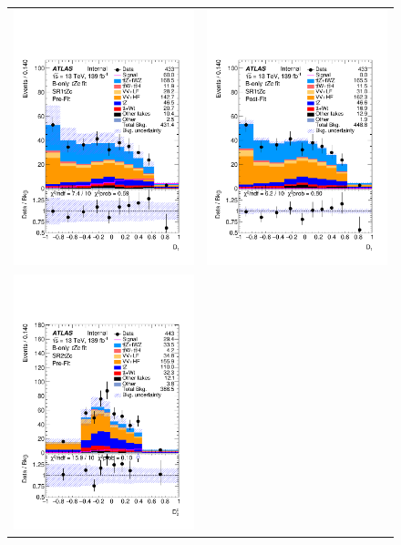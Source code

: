 \clearpage
\begin{figure}[htbp]
	\centering
	\begin{tabular}{cc}
		\includegraphics[width=.45\textwidth]{Appendices/AP10/figures/BONLY_CRSR_DL1rc_unblind/Plots/SR1} &
		\includegraphics[width=.45\textwidth]{Appendices/AP10/figures/BONLY_CRSR_DL1rc_unblind/Plots/SR1_postFit} \\
		\includegraphics[width=.45\textwidth]{Appendices/AP10/figures/BONLY_CRSR_DL1rc_unblind/Plots/SR2} &

\end{tabular}
\end{figure}
